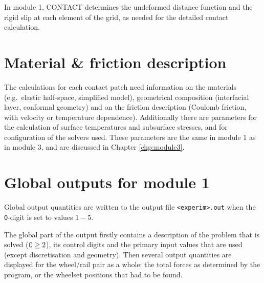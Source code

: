 \documentclass[12pt]{report}
\renewcommand{\magenta}[1]{}
\begin{document}
In module 1, CONTACT determines the undeformed distance function and the
rigid slip at each element of the grid, as needed for the detailed contact
calculation.
 
\section{Material \& friction description}

The calculations for each contact patch need information on the materials
(e.g.\ elastic half-space, simplified model), geometrical composition
(interfacial layer, conformal geometry) and on the friction description
(Coulomb friction, with velocity or temperature dependence). Additionally
there are parameters for the calculation of surface temperatures and
subsurface stresses, and for configuration of the solvers used. These
parameters are the same in module 1 as in module 3, and are discussed in
Chapter \ref{chp:module3}.

\section{Global outputs for module 1}
\label{sec:global_outpt1}

Global output quantities are written to the output file {\tt <experim>.out}
when the {\tt O}-digit is set to values $1-5$.

The global part of the output firstly contains a description of the problem
that is solved (${\tt O}\ge 2$), its control digits and the primary input
values that are used (except discretisation and geometry). Then several
output quantities are displayed for the wheel/rail pair as a whole: the
total forces as determined by the program, or the wheelset positions
\magenta{ and rates} that had to be found. 
\end{document}

